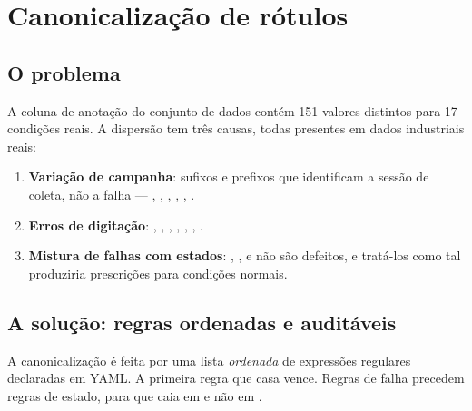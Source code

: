 \section{Canonicalização de rótulos}

\subsection{O problema}

A coluna de anotação do conjunto de dados contém \num{151} valores distintos
para 17 condições reais. A dispersão tem três causas, todas presentes em dados
industriais reais:

\begin{enumerate}
  \item \textbf{Variação de campanha}: sufixos e prefixos que identificam a
    sessão de coleta, não a falha --- , , ,
    , , .
  \item \textbf{Erros de digitação}: ,
    , , ,
    , , .
  \item \textbf{Mistura de falhas com estados}: , ,
     e  não são defeitos, e tratá-los como
    tal produziria prescrições para condições normais.
\end{enumerate}

\subsection{A solução: regras ordenadas e auditáveis}

A canonicalização é feita por uma lista \emph{ordenada} de expressões
regulares declaradas em YAML. A primeira regra que casa vence. Regras de falha
precedem regras de estado, para que  caia em
 e não em .

